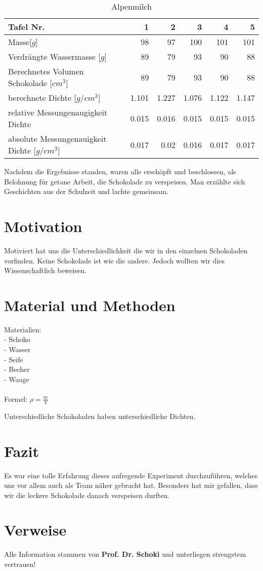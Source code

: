 \documentclass[12pt]{scrartcl}
\begin{document}
\begin{table}[h!]
	  \center
	  \caption{Alpenmilch}
      \label{tab:alpenmilch}	  
      \begin{tabular}{l|r|r|r|r|r}
      \toprule
      Tafel Nr. & 1 & 2 & 3 & 4 & 5\\
	  \midrule
      Masse[$g$] & 98 & 97 & 100 & 101 & 101\\
      \midrule
      Verdrängte Wassermasse [$g$] & 89 & 79 & 93 & 90 & 88\\
      \midrule
      Berechnetes Volumen Schokolade [$cm^3$] & 89 & 79 & 93 & 90 & 88\\
      \midrule
      berechnete Dichte [$g/cm^3$] & 1.101 & 1.227 & 1.076 & 1.122 & 1.147 \\
      \midrule
      relative Messungenaugigkeit Dichte & 0.015 & 0.016 & 0.015 & 0.015 & 0.015 \\
      \midrule
      absolute Messungenauigkeit Dichte [$g/cm^3$] & 0.017 & 0.02 & 0.016 & 0.017 & 0.017 \\
      \bottomrule
      \end{tabular}
	\end{table}
Nachdem die Ergebnisse standen, waren alle erschöpft und beschlossen, als Belohnung für getane Arbeit, die Schokolade zu verspeisen. Man erzählte sich Geschichten aus der Schulzeit und lachte gemeinsam.
\section{Motivation}
Motiviert hat uns die Unterschiedlichkeit die wir in den einzelnen Schokoladen vorfinden. Keine Schokolade ist wie die andere. Jedoch wollten wir dies Wissenschaftlich beweisen.
\section{Material und Methoden}
Materialien: \\
- Schoko \\
- Wasser \\
- Seife \\
- Becher \\
- Waage \\ \\
Formel: $\rho = \frac{m}{V}$
\pagebreak

Unterschiedliche Schokoladen haben unterschiedliche Dichten.
\section{Fazit}
Es war eine tolle Erfahrung dieses aufregende Experiment durchzuführen, welches uns vor allem auch als Team näher gebracht hat. Besonders hat mir gefallen, dass wir die leckere Schokolade danach verspeisen durften.
\section{Verweise}
Alle Information stammen von \textbf{Prof. Dr. Schoki} und unterliegen strengstem vertrauen! 
\end{document}
